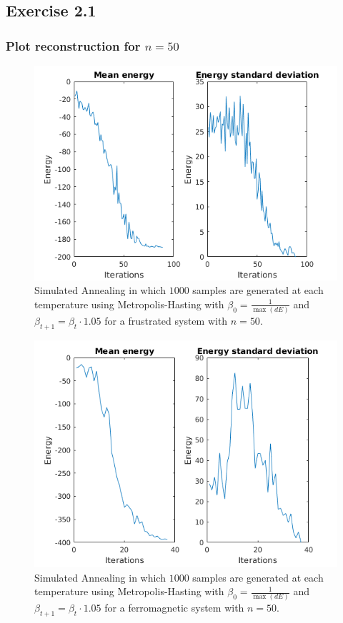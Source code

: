 \documentclass[10pt,a4paper]{article}
\begin{document}
\subsection{Exercise 2.1}
\subsubsection{Plot reconstruction for $n=50$}
\begin{figure}[h]
\centering
\includegraphics[scale=0.6]{../sa/sa_frustrated.png}
\caption{Simulated Annealing in which $1000$ samples are generated at each temperature using Metropolis-Hasting with $\beta_0=\frac{1}{\max(dE)}$ and $\beta_{t+1} = \beta_t \cdot 1.05$ for a frustrated system with $n=50$.}
\label{fig:sa_frustrated}
\end{figure}

\begin{figure}[h]
\centering
\includegraphics[scale=0.6]{../sa/sa_ferromagnetic.png}
\caption{Simulated Annealing in which $1000$ samples are generated at each temperature using Metropolis-Hasting with $\beta_0=\frac{1}{\max(dE)}$ and $\beta_{t+1} = \beta_t \cdot 1.05$ for a ferromagnetic system with $n=50$.}
\label{fig:sa_ferromagnetic}
\end{figure}
\end{document}

